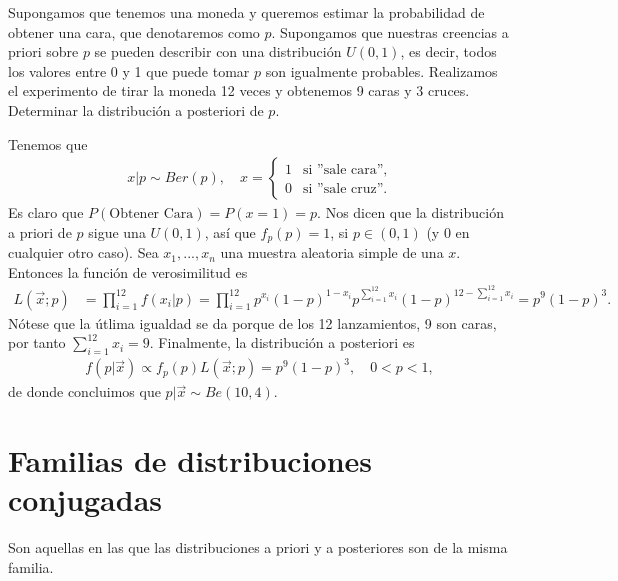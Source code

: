 \begin{ejemplo}
    Supongamos que tenemos una moneda y queremos estimar la probabilidad de obtener una cara, que denotaremos como $p$. Supongamos que nuestras creencias a priori sobre $p$ se pueden describir con una distribución $U(0,1)$, es decir, todos los valores entre 0 y 1 que puede tomar $p$ son igualmente probables. Realizamos el experimento de tirar la moneda 12 veces y obtenemos 9 caras y 3 cruces. Determinar la distribución a posteriori de $p$.

    Tenemos que
    \begin{align*}
        x | p \sim Ber(p), \quad x = \begin{cases}
                                         1 & \text{si ''sale cara''}, \\
                                         0 & \text{si ''sale cruz''}.
                                     \end{cases}
    \end{align*}
    Es claro que $P(\text{Obtener Cara}) = P(x = 1) = p$. Nos dicen que la distribución a priori de $p$ sigue una $U(0,1)$, así que $f_p(p) = 1$, si $p \in (0,1)$ (y 0 en cualquier otro caso). Sea $x_1,...,x_n$ una muestra aleatoria simple de una $x$. Entonces la función de verosimilitud es
    \begin{align*}
        L(\vec{x};p) & = \prod_{i=1}^{12} f(x_i | p) = \prod_{i=1}^{12} p^{x_i}(1-p)^{1-x_i} p^{\sum_{i=1}^{12} x_i}(1-p)^{12 - \sum_{i=1}^{12} x_i} = p^9(1-p)^3.
    \end{align*}
    Nótese que la útlima igualdad se da porque de los 12 lanzamientos, 9 son caras, por tanto $\sum_{i=1}^{12} x_i = 9$. Finalmente, la distribución a posteriori es
    \begin{align*}
        f(p | \vec{x}) \propto f_p(p)L(\vec{x};p) = p^9(1-p)^3, \quad 0 < p < 1,
    \end{align*}
    de donde concluimos que $p | \vec{x} \sim Be(10,4)$.
\end{ejemplo}

\section{Familias de distribuciones conjugadas}
Son aquellas en las que las distribuciones a priori y a posteriores son de la misma familia.

